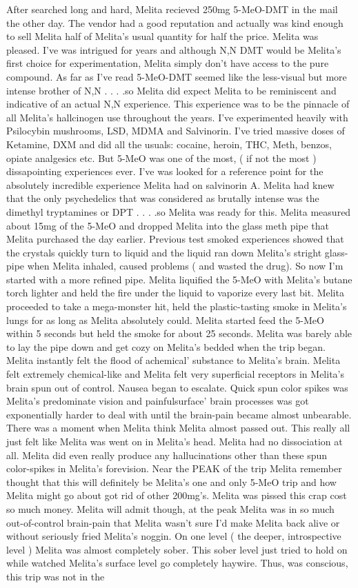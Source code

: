 \documentclass[12pt]{book}
\begin{document}
After searched long and hard, Melita recieved 250mg 5-MeO-DMT in the mail the other day. The vendor had a good reputation and actually was kind enough to sell Melita half of Melita's usual quantity for half the price. Melita was pleased. I've was intrigued for years and although N,N DMT would be Melita's first choice for experimentation, Melita simply don't have access to the pure compound. As far as I've read 5-MeO-DMT seemed like the less-visual but more intense brother of N,N . . .  .so Melita did expect Melita to be reminiscent and indicative of an actual N,N experience. This experience was to be the pinnacle of all Melita's hallcinogen use throughout the years. I've experimented heavily with Psilocybin mushrooms, LSD, MDMA and Salvinorin. I've tried massive doses of Ketamine, DXM and did all the usuals: cocaine, heroin, THC, Meth, benzos, opiate analgesics etc. But 5-MeO was one of the most, ( if not the most ) dissapointing experiences ever. I've was looked for a reference point for the absolutely incredible experience Melita had on salvinorin A. Melita had knew that the only psychedelics that was considered as brutally intense was the dimethyl tryptamines or DPT . . .  .so Melita was ready for this. Melita measured about 15mg of the 5-MeO and dropped Melita into the glass meth pipe that Melita purchased the day earlier. Previous test smoked experiences showed that the crystals quickly turn to liquid and the liquid ran down Melita's stright glass-pipe when Melita inhaled, caused problems ( and wasted the drug). So now I'm started with a more refined pipe. Melita liquified the 5-MeO with Melita's butane torch lighter and held the fire under the liquid to vaporize every last bit. Melita proceeded to take a mega-monster hit, held the plastic-tasting smoke in Melita's lungs for as long as Melita absolutely could. Melita started feed the 5-MeO within 5 seconds but held the smoke for about 25 seconds. Melita was barely able to lay the pipe down and get cozy on Melita's bedded when the trip began. Melita instantly felt the flood of achemical' substance to Melita's brain. Melita felt extremely chemical-like and Melita felt very superficial receptors in Melita's brain spun out of control. Nausea began to escalate. Quick spun color spikes was Melita's predominate vision and painfulsurface' brain processes was got exponentially harder to deal with until the brain-pain became almost unbearable. There was a moment when Melita think Melita almost passed out. This really all just felt like Melita was went on in Melita's head. Melita had no dissociation at all. Melita did even really produce any hallucinations other than these spun color-spikes in Melita's forevision. Near the PEAK of the trip Melita remember thought that this will definitely be Melita's one and only 5-MeO trip and how Melita might go about got rid of other 200mg's. Melita was pissed this crap cost so much money. Melita will admit though, at the peak Melita was in so much out-of-control brain-pain that Melita wasn't sure I'd make Melita back alive or without seriously fried Melita's noggin. On one level ( the deeper, introspective level ) Melita was almost completely sober. This sober level just tried to hold on while watched Melita's surface level go completely haywire. Thus, was conscious, this trip was not in the 
\end{document}

